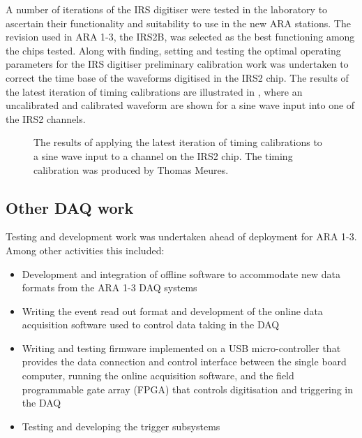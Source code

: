 A number of iterations of the IRS digitiser were tested in the laboratory to ascertain their functionality and suitability to use in the new ARA stations. The revision used in ARA 1-3, the IRS2B, was selected as the best functioning among the chips tested. Along with finding, setting and testing the optimal operating parameters for the IRS digitiser preliminary calibration work was undertaken to correct the time base of the waveforms digitised in the IRS2 chip. The results of the latest iteration of timing calibrations are illustrated in , where an uncalibrated and calibrated waveform are shown for a sine wave input into one of the IRS2 channels. 

\begin{figure}[htpb]
  \hfill
  \caption{The results of applying the latest iteration of timing calibrations to a sine wave input to a channel on the IRS2 chip. The timing calibration was produced by Thomas Meures.}
  \label{fig:calibration:ARA1-3-development:DDA-Waveforms}
\end{figure}

\subsection{Other DAQ work}
\label{sec:calibration:ARA1-3-development:Other-DAQ-work}

Testing and development work was undertaken ahead of deployment for ARA 1-3. Among other activities this included:

\begin{itemize}
\item Development and integration of offline software to accommodate new data formats from the ARA 1-3 DAQ systems
\item Writing the event read out format and development of the online data acquisition software used to control data taking in the DAQ
\item Writing and testing firmware implemented on a USB micro-controller that provides the data connection and control interface between the single board computer, running the online acquisition software, and the field programmable gate array (FPGA) that controls digitisation and triggering in the DAQ
\item Testing and developing the trigger subsystems
\end{itemize}

